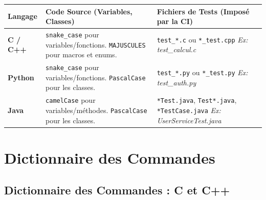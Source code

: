\documentclass[11pt, a4paper]{report}
\begin{document}
\begin{table}[h]
\centering
\renewcommand{\arraystretch}{1.3}
\begin{tabularx}{\textwidth}{|l|X|X|}
\hline
\textbf{Langage} & \textbf{Code Source (Variables, Classes)} & \textbf{Fichiers de Tests (Imposé par la CI)} \\
\hline
\textbf{C / C++} & 
\texttt{snake\_case} pour variables/fonctions. \texttt{MAJUSCULES} pour macros et enums. & 
\texttt{test\_*.c} ou \texttt{*\_test.cpp} \newline \textit{Ex: test\_calcul.c} \\
\hline
\textbf{Python} & 
\texttt{snake\_case} pour variables/fonctions. \texttt{PascalCase} pour les classes. & 
\texttt{test\_*.py} ou \texttt{*\_test.py} \newline \textit{Ex: test\_auth.py} \\
\hline
\textbf{Java} & 
\texttt{camelCase} pour variables/méthodes. \texttt{PascalCase} pour les classes. & 
\texttt{*Test.java}, \texttt{Test*.java}, \texttt{*TestCase.java} \newline \textit{Ex: UserServiceTest.java} \\
\hline
\end{tabularx}
\end{table}

\newpage

\chapter{Dictionnaire des Commandes}

\section{Dictionnaire des Commandes : C et C++}
\end{document}
